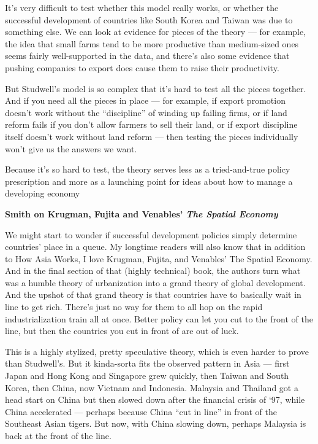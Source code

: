 \documentclass[
]{book}
\begin{document}
It's very difficult to test whether this model really works, or whether the successful development of countries like South Korea and Taiwan was due to something else. We can look at evidence for pieces of the theory --- for example, the idea that small farms tend to be more productive than medium-sized ones seems fairly well-supported in the data, and there's also some evidence that pushing companies to export does cause them to raise their productivity.

But Studwell's model is so complex that it's hard to test all the pieces together. And if you need all the pieces in place --- for example, if export promotion doesn't work without the ``discipline'' of winding up failing firms, or if land reform fails if you don't allow farmers to sell their land, or if export discipline itself doesn't work without land reform --- then testing the pieces individually won't give us the answers we want.

Because it's so hard to test, the theory serves less as a tried-and-true policy prescription and more as a launching point for ideas about how to manage a developing economy

\textbf{Smith on Krugman, Fujita and Venables' \emph{The Spatial Economy} }

We might start to wonder if successful development policies simply determine countries' place in a queue. My longtime readers will also know that in addition to How Asia Works, I love Krugman, Fujita, and Venables' The Spatial Economy. And in the final section of that (highly technical) book, the authors turn what was a humble theory of urbanization into a grand theory of global development. And the upshot of that grand theory is that countries have to basically wait in line to get rich. There's just no way for them to all hop on the rapid industrialization train all at once. Better policy can let you cut to the front of the line, but then the countries you cut in front of are out of luck.

This is a highly stylized, pretty speculative theory, which is even harder to prove than Studwell's. But it kinda-sorta fits the observed pattern in Asia --- first Japan and Hong Kong and Singapore grew quickly, then Taiwan and South Korea, then China, now Vietnam and Indonesia. Malaysia and Thailand got a head start on China but then slowed down after the financial crisis of `97, while China accelerated --- perhaps because China ``cut in line'' in front of the Southeast Asian tigers. But now, with China slowing down, perhaps Malaysia is back at the front of the line.
\end{document}
